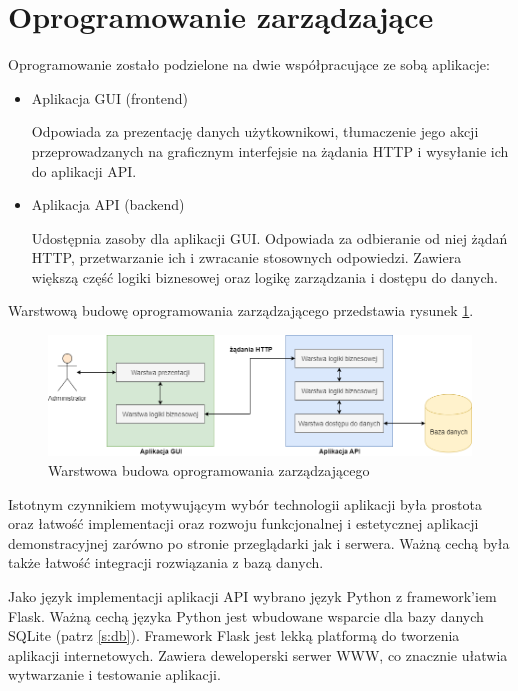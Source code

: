     \section{Oprogramowanie zarządzające}

    	Oprogramowanie zostało podzielone na dwie współpracujące ze sobą aplikacje:

    	\begin{itemize}
    		\item Aplikacja GUI (frontend)

    			Odpowiada za prezentację danych użytkownikowi, tłumaczenie jego akcji przeprowadzanych na graficznym interfejsie na żądania HTTP i wysyłanie ich do aplikacji API.

    		\item Aplikacja API (backend)

    			Udostępnia zasoby dla aplikacji GUI. Odpowiada za odbieranie od niej żądań HTTP, przetwarzanie ich i zwracanie stosownych odpowiedzi. Zawiera większą część logiki biznesowej oraz logikę zarządzania i dostępu do danych.
    	\end{itemize}

    	Warstwową budowę oprogramowania zarządzającego przedstawia rysunek \ref{fig:mngmt_subs_layers}.

        \begin{figure}[]
            \centering
            \includegraphics[width=\textwidth]{chapters/images/mngmt_subsystem_layers.png}
            \caption{Warstwowa budowa oprogramowania zarządzającego}
            \label{fig:mngmt_subs_layers}
        \end{figure}

       	Istotnym czynnikiem motywującym wybór technologii aplikacji była prostota oraz łatwość implementacji oraz rozwoju funkcjonalnej i estetycznej aplikacji demonstracyjnej zarówno po stronie przeglądarki jak i serwera. Ważną cechą była także łatwość integracji rozwiązania z bazą danych. 

		Jako język implementacji aplikacji API wybrano język Python z framework'iem Flask. Ważną cechą języka Python jest wbudowane wsparcie dla bazy danych SQLite (patrz \ref{s:db}). Framework Flask jest lekką platformą do tworzenia aplikacji internetowych. Zawiera deweloperski serwer WWW, co znacznie ułatwia wytwarzanie i testowanie aplikacji.

